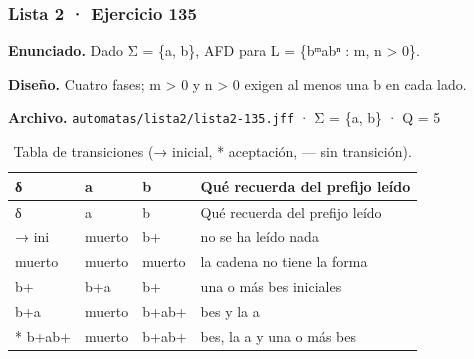 \hypertarget{lista-2-ejercicio-135}{%
\subsubsection{Lista 2 · Ejercicio 135}\label{lista-2-ejercicio-135}}

\textbf{Enunciado.} Dado Σ = \{a, b\}, AFD para L = \{bᵐabⁿ : m, n \textgreater{} 0\}.

\textbf{Diseño.} Cuatro fases; m \textgreater{} 0 y n \textgreater{} 0 exigen al menos una b en cada lado.

\textbf{Archivo.} \texttt{automatas/lista2/lista2-135.jff} · Σ = \{a, b\} · \textbar Q\textbar{} = 5

\begin{longtable}[]{@{}llll@{}}
\caption{Tabla de transiciones (→ inicial, * aceptación, --- sin transición).}\tabularnewline
\toprule\noalign{}
δ & a & b & Qué recuerda del prefijo leído \\
\midrule\noalign{}
\endfirsthead
\toprule\noalign{}
δ & a & b & Qué recuerda del prefijo leído \\
\midrule\noalign{}
\endhead
\bottomrule\noalign{}
\endlastfoot
→ ini & muerto & b+ & no se ha leído nada \\
muerto & muerto & muerto & la cadena no tiene la forma \\
b+ & b+a & b+ & una o más bes iniciales \\
b+a & muerto & b+ab+ & bes y la a \\
* b+ab+ & muerto & b+ab+ & bes, la a y una o más bes \\
\end{longtable}

